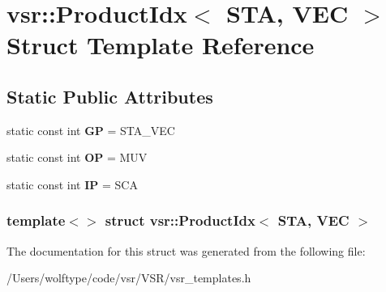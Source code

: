 \hypertarget{structvsr_1_1_product_idx_3_01_s_t_a_00_01_v_e_c_01_4}{\section{vsr\-:\-:Product\-Idx$<$ S\-T\-A, V\-E\-C $>$ Struct Template Reference}
\label{structvsr_1_1_product_idx_3_01_s_t_a_00_01_v_e_c_01_4}
}
\subsection*{Static Public Attributes}
\begin{DoxyCompactItemize}
\item 
\hypertarget{structvsr_1_1_product_idx_3_01_s_t_a_00_01_v_e_c_01_4_a26b27d9b4b105d9d156f8270a94e38fe}{static const int {\bfseries G\-P} = S\-T\-A\-\_\-\-V\-E\-C}\label{structvsr_1_1_product_idx_3_01_s_t_a_00_01_v_e_c_01_4_a26b27d9b4b105d9d156f8270a94e38fe}

\item 
\hypertarget{structvsr_1_1_product_idx_3_01_s_t_a_00_01_v_e_c_01_4_a3ca9df707b2ec7552f951fe23d6a499a}{static const int {\bfseries O\-P} = M\-U\-V}\label{structvsr_1_1_product_idx_3_01_s_t_a_00_01_v_e_c_01_4_a3ca9df707b2ec7552f951fe23d6a499a}

\item 
\hypertarget{structvsr_1_1_product_idx_3_01_s_t_a_00_01_v_e_c_01_4_adc619fbc4c62bb6566d36b1687dfd81b}{static const int {\bfseries I\-P} = S\-C\-A}\label{structvsr_1_1_product_idx_3_01_s_t_a_00_01_v_e_c_01_4_adc619fbc4c62bb6566d36b1687dfd81b}

\end{DoxyCompactItemize}
\subsubsection*{template$<$$>$ struct vsr\-::\-Product\-Idx$<$ S\-T\-A, V\-E\-C $>$}



The documentation for this struct was generated from the following file\-:\begin{DoxyCompactItemize}
\item 
/\-Users/wolftype/code/vsr/\-V\-S\-R/vsr\-\_\-templates.\-h\end{DoxyCompactItemize}
